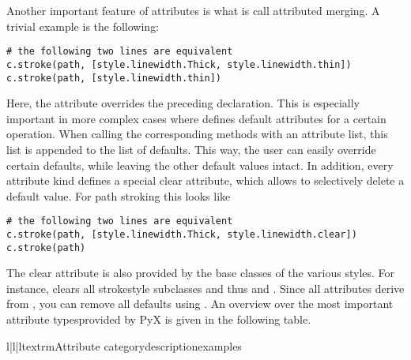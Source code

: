 Another important feature of \PyX{} attributes is what is call attributed
merging. A trivial example is the following:
\begin{verbatim}
# the following two lines are equivalent
c.stroke(path, [style.linewidth.Thick, style.linewidth.thin])
c.stroke(path, [style.linewidth.thin])
\end{verbatim}
Here, the  attribute overrides the preceding
 declaration. This is especially important
in more complex cases where \PyX defines default attributes for a
certain operation. When calling the corresponding methods with an
attribute list, this list is appended to the list of defaults.
This way, the user can easily override certain defaults, while leaving
the other default values intact. In addition, every attribute kind
defines a special clear attribute, which allows to selectively delete
a default value. For path stroking this looks like
\begin{verbatim}
# the following two lines are equivalent
c.stroke(path, [style.linewidth.Thick, style.linewidth.clear])
c.stroke(path)
\end{verbatim}
The clear attribute is also provided by the base classes of 
the various styles. For instance, 
clears all strokestyle subclasses and thus  and
. Since all attributes derive from
, you can remove all defaults using
. An overview over the most important attribute typesprovided 
by PyX is given in the following table.
\medskip
\begin{tableiii}{l|l|l}{textrm}{Attribute category}{description}{examples}
\end{tableiii}
\medskip

